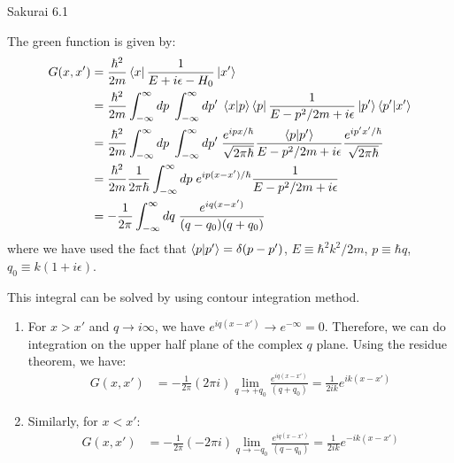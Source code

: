 \documentclass{article}
\begin{document}
\begin{section}{Sakurai 6.1}
\begin{enumerate}
\begin{tcolorbox}[breakable]
		The green function is given by:
		\begin{align*}
			G(x, x') & = \frac{\hbar^2}{2m} \bra{x}\frac{1}{E + i\epsilon - H_0}\ket{x'}                                                                                                                                                  \\
			         & = \frac{\hbar^2}{2m} \int_{-\infty}^{\infty} dp\; \int_{-\infty}^{\infty} dp'\; \bra{x}\ket{p} \bra{p}\frac{1}{E - p^2/2m + i\epsilon}\ket{p'} \bra{p'}\ket{x'}                                                    \\
			         & = \frac{\hbar^2}{2m} \int_{-\infty}^{\infty} dp\; \int_{-\infty}^{\infty} dp'\; \frac{e^{i p x/\hbar}}{\sqrt{2\pi\hbar}} \frac{\bra{p}\ket{p'}}{E - p^2/2m + i\epsilon} \frac{e^{i p' x'/\hbar}}{\sqrt{2\pi\hbar}} \\
			         & = \frac{\hbar^2}{2m} \frac{1}{2\pi\hbar} \int_{-\infty}^{\infty} dp\;  e^{i p (x-x')/\hbar} \frac{1}{E - p^2/2m + i\epsilon}                                                                                       \\
			         & = -\frac{1}{2\pi} \int_{-\infty}^{\infty} dq\;  \frac{e^{i q (x-x')}}{(q-q_0) (q+q_0)}
		\end{align*}
		where we have used the fact that $\bra{p}\ket{p'} = \delta(p-p')$, $E\equiv \hbar^2k^2/2m$, $p \equiv \hbar q$, $q_0 \equiv k(1+i \epsilon)$.

		This integral can be solved by using contour integration method.

		\begin{enumerate}
			\item For $x > x'$ and $q \to i\infty$, we have $e^{i q (x-x')} \to e^{-\infty} = 0$. Therefore, we can do integration on the upper half plane of the complex $q$ plane. Using the residue theorem, we have:
			\begin{align*}
				G(x,x') & = -\frac{1}{2\pi} (2\pi i) \lim_{q \to +q_0} \frac{e^{iq(x-x')}}{(q+q_0)} = \frac{1}{2ik} e^{ik(x-x')}
			\end{align*}
			\item Similarly, for $x < x'$:
			\begin{align*}
				G(x,x') & = -\frac{1}{2\pi} (-2\pi i) \lim_{q \to -q_0} \frac{e^{iq(x-x')}}{(q-q_0)} = \frac{1}{2ik} e^{-ik(x-x')}
			\end{align*}
		\end{enumerate}
	\end{tcolorbox}


\end{enumerate}
\end{section}
\end{document}

